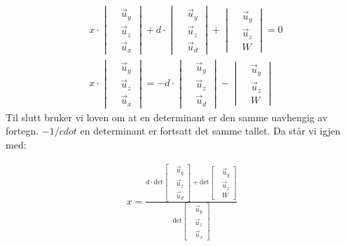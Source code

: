 \begin{align}
&x\cdot \begin{vmatrix}
	&\vec{u}_y\\
	&\vec{u}_z \\
	&\vec{u}_x
	\end{vmatrix}
	+
	d\cdot
	\begin{vmatrix}
	&\vec{u}_y\\
	&\vec{u}_z \\
	&\vec{u}_d
	\end{vmatrix}
	+
	\begin{vmatrix}
	&\vec{u}_y\\
	&\vec{u}_z \\
	&W
	\end{vmatrix}
	=0 \nonumber \\ 
	&x\cdot \begin{vmatrix}
	&\vec{u}_y\\
	&\vec{u}_z \\
	&\vec{u}_x
	\end{vmatrix}
	=-d\cdot
	\begin{vmatrix}
	&\vec{u}_y\\
	&\vec{u}_z \\
	&\vec{u}_d
	\end{vmatrix}
	-
	\begin{vmatrix}
	&\vec{u}_y\\
	&\vec{u}_z \\
	&W
	\end{vmatrix} \nonumber 
\end{align}
Til slutt bruker vi loven om at en determinant er den samme uavhengig av fortegn. $-1/cdot$ en determinant er fortsatt det samme tallet. Da står vi igjen med: 

\begin{align}
    x=\frac{d\cdot
    \text{det}
	\begin{bmatrix}
	&\vec{u}_y\\
	&\vec{u}_z \\
	&\vec{u}_d
	\end{bmatrix}+\text{det}\begin{bmatrix}
	&\vec{u}_y\\
	&\vec{u}_z \\
	&W
	\end{bmatrix}}{\text{det}\begin{bmatrix}
	&\vec{u}_y\\
	&\vec{u}_z \\
	&\vec{u}_x
	\end{bmatrix}}
\end{align}

